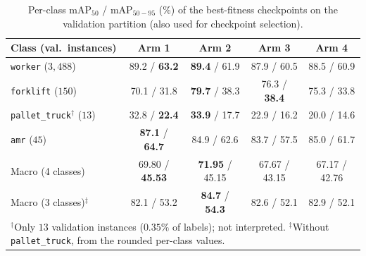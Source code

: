 \begin{table}[t]
\caption{Per-class $\text{mAP}_{50}$ / $\text{mAP}_{50-95}$ (\%) of the best-fitness checkpoints on the validation partition (also used for checkpoint selection).}
\label{tab:per_class_results}
\centering
\footnotesize
\setlength{\tabcolsep}{4pt}
\begin{tabular}{lcccc}
\toprule
\textbf{Class (val.\ instances)} & \textbf{Arm 1} & \textbf{Arm 2} & \textbf{Arm 3} & \textbf{Arm 4} \\
\midrule
\texttt{worker} ($3{,}488$) & 89.2 / \textbf{63.2} & \textbf{89.4} / 61.9 & 87.9 / 60.5 & 88.5 / 60.9 \\
\texttt{forklift} ($150$) & 70.1 / 31.8 & \textbf{79.7} / 38.3 & 76.3 / \textbf{38.4} & 75.3 / 33.8 \\
\texttt{pallet\_truck}$^{\dagger}$ ($13$) & 32.8 / \textbf{22.4} & \textbf{33.9} / 17.7 & 22.9 / 16.2 & 20.0 / 14.6 \\
\texttt{amr} ($45$) & \textbf{87.1} / \textbf{64.7} & 84.9 / 62.6 & 83.7 / 57.5 & 85.0 / 61.7 \\
\midrule
Macro (4 classes) & 69.80 / \textbf{45.53} & \textbf{71.95} / 45.15 & 67.67 / 43.15 & 67.17 / 42.76 \\
Macro (3 classes)$^{\ddagger}$ & 82.1 / 53.2 & \textbf{84.7} / \textbf{54.3} & 82.6 / 52.1 & 82.9 / 52.1 \\
\bottomrule
\multicolumn{5}{p{0.92\textwidth}}{\scriptsize $^{\dagger}$Only $13$ validation instances ($0.35\%$ of labels); not interpreted. $^{\ddagger}$Without \texttt{pallet\_truck}, from the rounded per-class values.} \\
\end{tabular}
\end{table}

